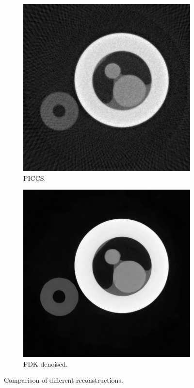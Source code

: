 \begin{figure}
    \medskip
  
    \begin{subfigure}[t]{.45\textwidth}
      \centering
      \includegraphics[width=\linewidth]{figures/kimrobertPICCS.png}
      \caption{PICCS. }
    \end{subfigure}
    \hfill
    \begin{subfigure}[t]{.45\textwidth}
      \centering
      \includegraphics[width=\linewidth]{figures/kimrobertdepth1dn.png}
      \caption{FDK denoised. }
    \end{subfigure}
    \caption[Comparison of different reconstructions]{Comparison of different reconstructions. }
    \label{fig:kimrobertcomparison}
\end{figure}

